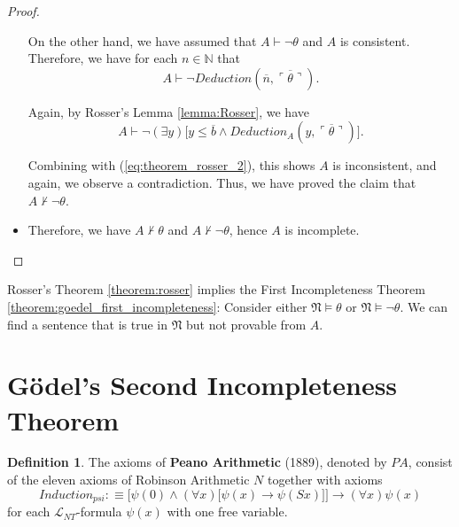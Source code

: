 \documentclass[11pt,letterpaper]{book}
\theoremstyle{definition}
\newtheorem{definition}{Definition}[section]
\begin{document}
\begin{proof}
\begin{itemize}
{On the other hand, we have assumed that $A \vdash \lnot \theta $ and $A$ is consistent. Therefore, we have for each $n \in \mathbb{N}$ that
$$ A \vdash \lnot Deduction( \overline{n}, \overline{\ulcorner \theta \urcorner} ). $$

Again, by Rosser's Lemma \ref{lemma:Rosser}, we have
$$ A \vdash \lnot (\exists y ) \bigg[y \leq \overline{b} \land Deduction_A (y, \overline{\ulcorner \theta \urcorner}) \bigg]  .$$

Combining with (\ref{eq:theorem_rosser_2}), this shows $A$ is inconsistent, and again, we observe a contradiction. Thus, we have proved the claim that $A \not \vdash \lnot \theta$.
}
\item{Therefore, we have $ A \not \vdash \theta$ and $A \not \vdash \lnot \theta$, hence $A$ is incomplete.}
\end{itemize}

\end{proof}

Rosser's Theorem \ref{theorem:rosser} implies the First Incompleteness Theorem \ref{theorem:goedel_first_incompleteness}: Consider either $\mathfrak{N} \models \theta$ or $\mathfrak{N} \models \lnot \theta$. We can find a sentence that is true in $\mathfrak{N}$ but not provable from $A$.


\section{G\"odel's Second Incompleteness Theorem}

\begin{definition}
The axioms of \textbf{Peano Arithmetic} (1889), denoted by $PA$, consist of the eleven axioms of Robinson Arithmetic $N$ together with axioms
$$ Induction_{psi } :\equiv \bigg[ \psi(0) \land (\forall x ) \big[ \psi (x) \rightarrow \psi( S x ) \big] \bigg] \rightarrow (\forall x ) \psi(x) $$
for each $\mathcal{L}_{NT}$-formula $\psi (x)$ with one free variable.
\end{definition}
\end{document}
